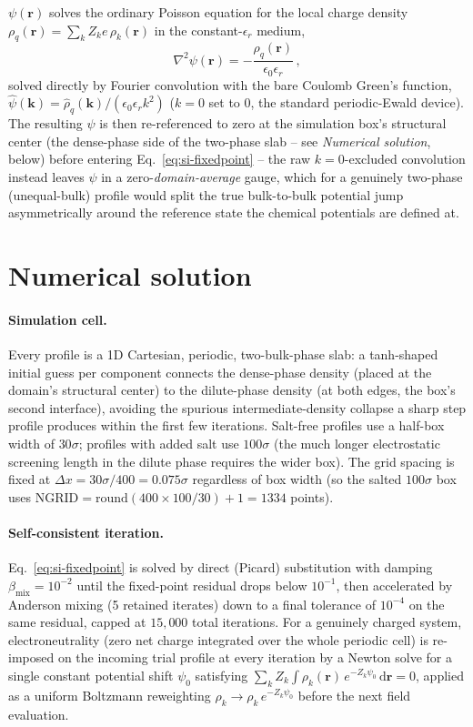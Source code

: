 \documentclass[journal=macl,manuscript=suppinfo,layout=onecolumn]{achemso}
\begin{document}
$\psi(\mathbf{r})$ solves the ordinary Poisson equation for the local charge density $\rho_q(\mathbf{r})=\sum_kZ_ke\,\rho_k(\mathbf{r})$ in the constant-$\epsilon_r$ medium,
\begin{equation}
    \nabla^2\psi(\mathbf{r}) = -\frac{\rho_q(\mathbf{r})}{\epsilon_0\epsilon_r}\,,
    \label{eq:si-poisson}
\end{equation}
solved directly by Fourier convolution with the bare Coulomb Green's function, $\hat\psi(\mathbf{k})=\hat\rho_q(\mathbf{k})/(\epsilon_0\epsilon_r k^2)$ ($k=0$ set to $0$, the standard periodic-Ewald device). The resulting $\psi$ is then re-referenced to zero at the simulation box's structural center (the dense-phase side of the two-phase slab -- see \textit{Numerical solution}, below) before entering Eq.~\ref{eq:si-fixedpoint} -- the raw $k=0$-excluded convolution instead leaves $\psi$ in a zero-\emph{domain-average} gauge, which for a genuinely two-phase (unequal-bulk) profile would split the true bulk-to-bulk potential jump asymmetrically around the reference state the chemical potentials are defined at.

\section{Numerical solution}
\label{si:numerics}

\paragraph{Simulation cell.} Every profile is a 1D Cartesian, periodic, two-bulk-phase slab: a tanh-shaped initial guess per component connects the dense-phase density (placed at the domain's structural center) to the dilute-phase density (at both edges, the box's second interface), avoiding the spurious intermediate-density collapse a sharp step profile produces within the first few iterations. Salt-free profiles use a half-box width of $30\sigma$; profiles with added salt use $100\sigma$ (the much longer electrostatic screening length in the dilute phase requires the wider box). The grid spacing is fixed at $\Delta x = 30\sigma/400 = 0.075\sigma$ regardless of box width (so the salted $100\sigma$ box uses $\mathrm{NGRID}=\mathrm{round}(400\times100/30)+1=1334$ points).

\paragraph{Self-consistent iteration.} Eq.~\ref{eq:si-fixedpoint} is solved by direct (Picard) substitution with damping $\beta_\mathrm{mix}=10^{-2}$ until the fixed-point residual drops below $10^{-1}$, then accelerated by Anderson mixing (5 retained iterates) down to a final tolerance of $10^{-4}$ on the same residual, capped at $15{,}000$ total iterations. For a genuinely charged system, electroneutrality (zero net charge integrated over the whole periodic cell) is re-imposed on the incoming trial profile at every iteration by a Newton solve for a single constant potential shift $\psi_0$ satisfying $\sum_kZ_k\int\rho_k(\mathbf{r})\,e^{-Z_k\psi_0}\,\mathrm{d}\mathbf{r}=0$, applied as a uniform Boltzmann reweighting $\rho_k\to\rho_k\,e^{-Z_k\psi_0}$ before the next field evaluation.
\end{document}
